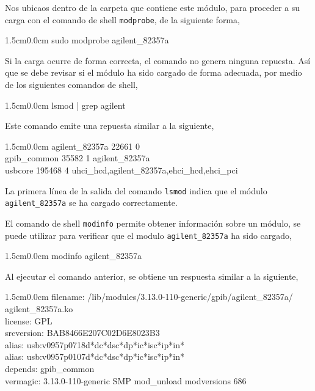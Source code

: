 \documentclass[paper=letter,oneside,fontsize=11pt, parskip=full]{scrartcl}
\newenvironment{code}
	{\begin{adjustwidth}{1.5cm}{0.0cm}\ttfamily}
	{\end{adjustwidth}}
\begin{document}
		Nos ubicaos dentro de la carpeta que contiene este módulo, para proceder a su carga con el comando de shell \texttt{modprobe}, de la siguiente forma,
		
		\begin{code}
			sudo modprobe agilent\_82357a
		\end{code}
		
		Si la carga ocurre de forma correcta, el comando no genera ninguna repuesta. Así que se debe revisar si el módulo ha sido cargado de forma adecuada, por medio de los siguientes comandos de shell,
		
		\begin{code}		
			lsmod | grep agilent
		\end{code}
	
		Este comando emite una repuesta similar a la siguiente,

		\begin{code}
			agilent\_82357a	22661  0 \\				
			gpib\_common	35582  1 agilent\_82357a  \\				
			usbcore	195468  4 uhci\_hcd,agilent\_82357a,ehci\_hcd,ehci\_pci \\
		\end{code}
		
		La primera línea de la salida del comando \texttt{lsmod} indica que el módulo \texttt{agilent\_82357a} se ha cargado correctamente. 	
		
		El comando de shell \texttt{modinfo} permite obtener información sobre un módulo, se puede utilizar para verificar que el modulo \texttt{agilent\_82357a} ha sido cargado, 
		
		\begin{code}
			modinfo agilent_82357a 			
		\end{code}
		
		Al ejecutar el comando anterior, se obtiene un respuesta similar a la siguiente,
		
		\begin{code}
			filename:    /lib/modules/3.13.0-110-generic/gpib/agilent\_82357a/ \\ agilent\_82357a.ko \\
			license:        GPL \\
			srcversion:     BAB8466E207C02D6E8023B3 \\
			alias:          usb:v0957p0718d*dc*dsc*dp*ic*isc*ip*in* \\
			alias:          usb:v0957p0107d*dc*dsc*dp*ic*isc*ip*in* \\
			depends:        gpib\_common \\
			vermagic:       3.13.0-110-generic SMP mod\_unload  modversions 686 
		\end{code}
	
\end{document}
